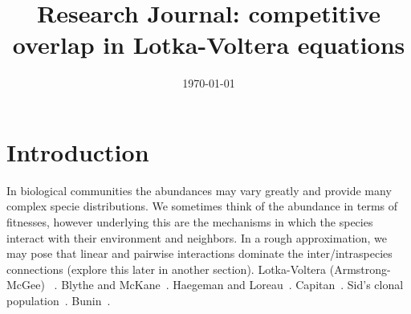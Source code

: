 \documentclass[11pt,a4paper,final]{iopart}
\begin{document}
\title[Research Journal: Competitive Overlap]{Research Journal: competitive overlap in Lotka-Voltera equations}
\date{\today}

\iffalse
\author{Jeremy Rothschild$^1$}
\ead{rothschild@physics.utoronto.ca}

\author{Nava Leibovitch$^1$}
\ead{...@physics.utoronto.ca}

\address{Address Three, Neverland}
\ead{author.two@mail.com}

\author[cor1]{Author Three}
\address{Address Four, Neverland}
\eads{\mailto{author.three@mail.com}, \mailto{author.three@gmail.com}}
\address{$^1$University of Toronto, Toronto}

\begin{abstract}
This document describes the  preparation of an article using \LaTeXe\ and 
\verb"iopart.cls" (the IOP \LaTeXe\ preprint class file).
This class file is designed to help 
authors produce preprints in a form suitable for submission to any of the
journals published by IOP Publishing.
Authors submitting to any IOP journal, i.e.\ 
both single- and double-column ones, should follow the guidelines set out here. 
On acceptance, their TeX code will be converted to 
the appropriate format for the journal concerned.

\end{abstract}

\vspace{2pc}
\noindent{\it Keywords}: Article preparation, IOP journals
\submitto{\JPA}
\fi

\section{Introduction}

In biological communities the abundances may vary greatly and provide many complex specie distributions. 
We sometimes think of the abundance in terms of fitnesses, however underlying this are the mechanisms in which the species interact with their environment and neighbors. 
In a rough approximation, we may pose that linear and pairwise interactions dominate the inter/intraspecies connections (explore this later in another section). 
Lotka-Voltera (Armstrong-McGee) ~\cite{Lotka1950,Smale1976a,Armstrong1976}. 
Blythe and McKane~\cite{Baxter2005,Baxter2006,Blythe2007}. 
Haegeman and Loreau~\cite{Haegeman2011}. 
Capitan~\cite{Capitan2015,Capitan2017}. 
Sid's clonal population~\cite{Goyal2015}. 
Bunin~\cite{Bunin2016}.
\end{document}

